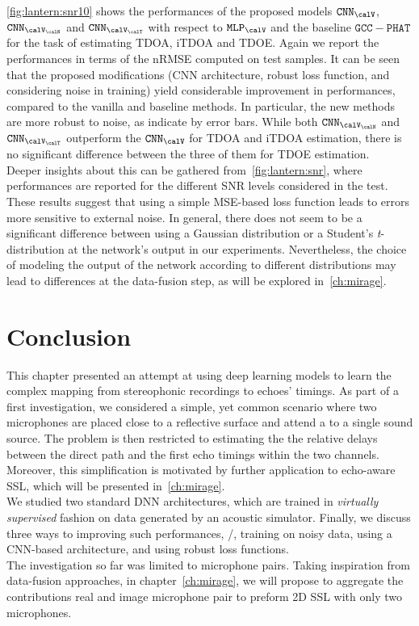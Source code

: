 \noindent \cref{fig:lantern:snr10} shows the performances of the proposed models $\mathtt{CNN}_{\calV}$, $\mathtt{CNN}_{\calV_\calN}$ and $\mathtt{CNN}_{\calV_\calT}$
with respect to $\mathtt{MLP}_{\calV}$ and the baseline $\mathtt{GCC-PHAT}$ for the task of estimating \ac{TDOA}, \ac{iTDOA} and \ac{TDOE}.
Again we report the performances in terms of the \ac{nRMSE} computed on test samples.
It can be seen that the proposed modifications (\ac{CNN} architecture, robust loss function, and considering noise in training) yield considerable improvement in performances, compared to the vanilla and baseline methods.
In particular, the new methods are more robust to noise, as indicate by error bars.
While both $\mathtt{CNN}_{\calV_\calN}$ and $\mathtt{CNN}_{\calV_\calT}$ outperform the $\mathtt{CNN}_{\calV}$ for \ac{TDOA} and \ac{iTDOA} estimation, there is no significant difference between the three of them for \ac{TDOE} estimation.
\\Deeper insights about this can be gathered from~\cref{fig:lantern:snr}, where performances are reported for the different \ac{SNR} levels considered in the test.
These results suggest that using a simple \ac{MSE}-based loss function leads to errors more sensitive to external noise.
In general, there does not seem to be a significant difference between using a Gaussian distribution or a Student's \textit{t}-distribution at the network's output in our experiments.
Nevertheless, the choice of modeling the output of the network according to different distributions may lead to differences at the data-fusion step, as will be explored in~\cref{ch:mirage}.

\section{Conclusion}\label{sec:lantern:conclusion}
This chapter presented an attempt at using deep learning models to learn the complex mapping from stereophonic recordings to echoes' timings.
As part of a first investigation, we considered a simple, yet common scenario where two microphones are placed close to a reflective surface and attend a to a single sound source.
The problem is then restricted to estimating the the relative delays between the direct path and the first echo timings within the two channels.
Moreover, this simplification is motivated by further application to echo-aware \ac{SSL}, which will be presented in~\cref{ch:mirage}.
\\We studied two standard \ac{DNN} architectures, which are trained in \textit{virtually supervised} fashion on data generated by an acoustic simulator.
Finally, we discuss three ways to improving such performances, \ie/, training on noisy data, using a \ac{CNN}-based architecture, and using robust loss functions.
\\The investigation so far was limited to microphone pairs.
Taking inspiration from data-fusion approaches, in chapter~\cref{ch:mirage}, we will propose to aggregate the contributions real and image microphone pair to preform 2D \ac{SSL} with only two microphones.

